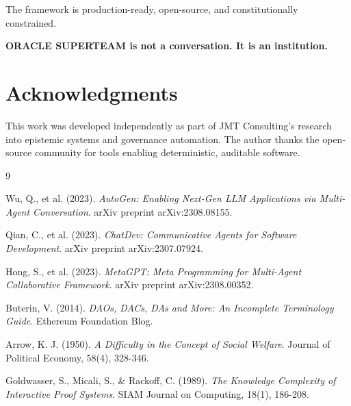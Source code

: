 \documentclass[11pt, letterpaper]{article}
\begin{document}
The framework is production-ready, open-source, and constitutionally constrained.

\textbf{ORACLE SUPERTEAM is not a conversation. It is an institution.}

\section*{Acknowledgments}

This work was developed independently as part of JMT Consulting's research into epistemic systems and governance automation. The author thanks the open-source community for tools enabling deterministic, auditable software.

\begin{thebibliography}{9}

Wu, Q., et al. (2023).
\textit{AutoGen: Enabling Next-Gen LLM Applications via Multi-Agent Conversation}.
arXiv preprint arXiv:2308.08155.

Qian, C., et al. (2023).
\textit{ChatDev: Communicative Agents for Software Development}.
arXiv preprint arXiv:2307.07924.

Hong, S., et al. (2023).
\textit{MetaGPT: Meta Programming for Multi-Agent Collaborative Framework}.
arXiv preprint arXiv:2308.00352.

Buterin, V. (2014).
\textit{DAOs, DACs, DAs and More: An Incomplete Terminology Guide}.
Ethereum Foundation Blog.

Arrow, K. J. (1950).
\textit{A Difficulty in the Concept of Social Welfare}.
Journal of Political Economy, 58(4), 328-346.

Goldwasser, S., Micali, S., \& Rackoff, C. (1989).
\textit{The Knowledge Complexity of Interactive Proof Systems}.
SIAM Journal on Computing, 18(1), 186-208.

\end{thebibliography}

\appendix
\end{document}
